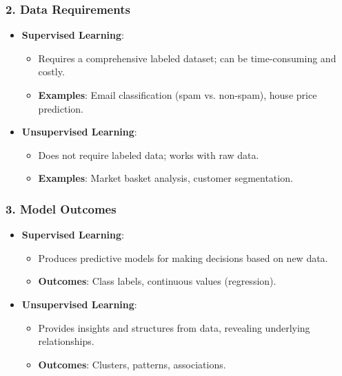 \documentclass[aspectratio=169]{beamer}
\begin{document}
\begin{frame}[fragile]
    \frametitle{2. Data Requirements}
    \begin{itemize}
        \item \textbf{Supervised Learning}:
        \begin{itemize}
            \item Requires a comprehensive labeled dataset; can be time-consuming and costly.
            \item \textbf{Examples}: Email classification (spam vs. non-spam), house price prediction.
        \end{itemize}
        
        \item \textbf{Unsupervised Learning}:
        \begin{itemize}
            \item Does not require labeled data; works with raw data.
            \item \textbf{Examples}: Market basket analysis, customer segmentation.
        \end{itemize}
    \end{itemize}
\end{frame}

\begin{frame}[fragile]
    \frametitle{3. Model Outcomes}
    \begin{itemize}
        \item \textbf{Supervised Learning}:
        \begin{itemize}
            \item Produces predictive models for making decisions based on new data.
            \item \textbf{Outcomes}: Class labels, continuous values (regression).
        \end{itemize}
        
        \item \textbf{Unsupervised Learning}:
        \begin{itemize}
            \item Provides insights and structures from data, revealing underlying relationships.
            \item \textbf{Outcomes}: Clusters, patterns, associations.
        \end{itemize}
    \end{itemize}
\end{frame}
\end{document}
